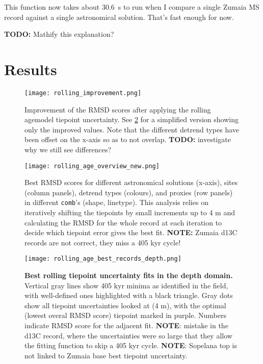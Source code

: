 \documentclass[draft]{agujournal2019}
\begin{document}
This function now takes about \qty{30.6}{\second} to run when I compare a
single Zumaia MS record against a single astronomical solution. That's fast
enough for now.

\textbf{TODO:} Mathify this explanation?





\section{Results}\label{sec:results}

\begin{figure}[htb]
  \centering \texttt{[image: rolling\_improvement.png]}
  \caption{\label{fig:rolling-improvement} Improvement of the RMSD scores after
    applying the rolling agemodel tiepoint uncertainty. See
    \cref{fig:rolling-rmsd} for a simplified version showing only the improved
    values. Note that the different detrend types have been offset on the
    x-axis so as to not overlap. \textbf{TODO:} investigate why we still see
    differences? }
\end{figure}

\begin{figure}[htb]
  \centering
  \texttt{[image: rolling\_age\_overview\_new.png]}
  \caption{\label{fig:rolling-rmsd} Best \gls{RMSD} scores for different
    astronomical solutions (x-axis), sites (column panels), detrend types
    (colours), and proxies (row panels) in different \texttt{comb}'s (shape,
    linetype). This analysis relies on iteratively shifting the tiepoints by
    small increments up to \textpm{}4 m and calculating the \gls{RMSD} for the whole
    record at each iteration to decide which tiepoint error gives the best fit.
    \textbf{NOTE:} Zumaia \gls{d13C} records are not correct, they miss a 405
    kyr cycle! }
\end{figure}


\begin{figure}[htb]
  \centering
  \texttt{[image: rolling\_age\_best\_records\_depth.png]}
  \caption{\label{fig:rolling-depth} \textbf{Best rolling tiepoint uncertainty
      fits in the depth domain.} Vertical gray lines show 405 kyr minima as
    identified in the field, with well-defined ones highlighted with a black
    triangle. Gray dots show all tiepoint uncertainties looked at (\textpm{}4 m),
    with the optimal (lowest overal \gls{RMSD} score) tiepoint marked in
    purple. Numbers indicate \gls{RMSD} score for the adjacent fit.
    \textbf{NOTE}: mistake in the \gls{d13C} record, where the uncertainties
    were so large that they allow the fitting function to skip a 405 kyr cycle.
    \textbf{NOTE}: Sopelana top is not linked to Zumaia base best tiepoint
    uncertainty. }
\end{figure}
\end{document}
